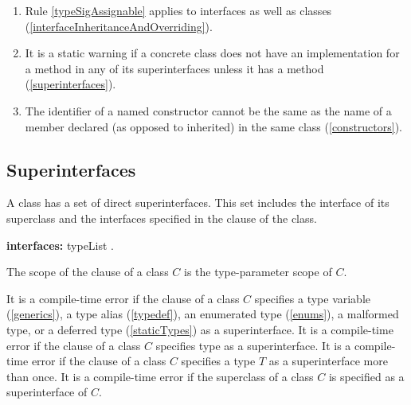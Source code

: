 \documentclass{article}
\begin{document}
{\begin{enumerate}
\begin{itemize}
  \end{itemize}  (\ref{interfaceInheritanceAndOverriding})
\item  Rule \ref{typeSigAssignable} applies to interfaces as well as classes  (\ref{interfaceInheritanceAndOverriding}).
\item  It is a static warning if a concrete class does not have an implementation for a  method in any of its superinterfaces  unless it has a  method (\ref{superinterfaces}).
\item The identifier of a named constructor cannot be the same as the name of a member declared (as opposed to inherited) in the same class (\ref{constructors}).
\end{enumerate}
}



\subsection{ Superinterfaces}

\LMHash{}
A class has a set of direct superinterfaces. This set includes the interface of its superclass and the interfaces specified in the \IMPLEMENTS{}  clause of the class.

\begin{grammar}
{\bf interfaces:}
      \IMPLEMENTS{} typeList
    .
\end{grammar}

\LMHash{}
The scope of the \IMPLEMENTS{} clause of a class $C$ is the type-parameter scope of $C$.

\LMHash{}
It is a compile-time error if the \IMPLEMENTS{} clause of a class $C$ specifies a type variable (\ref{generics}), a type alias (\ref{typedef}), an enumerated type (\ref{enums}), a malformed type, or a deferred type (\ref{staticTypes}) as a superinterface.
It is a compile-time error if the \IMPLEMENTS{} clause of a class $C$ specifies type \DYNAMIC{} as a superinterface.
It is a compile-time error if the \IMPLEMENTS{} clause of a class $C$ specifies a type $T$ as a superinterface more than once.
It is a compile-time error if the superclass of a class $C$ is specified as a superinterface of $C$.
\end{document}
